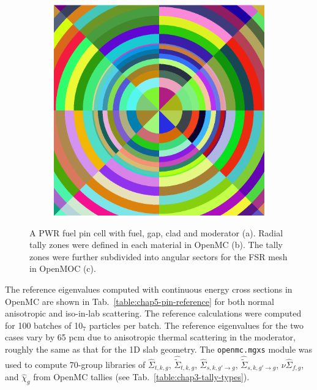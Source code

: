 \begin{figure}[H]
\begin{subfigure}{.32\textwidth}
  \caption{}
  \label{fig:chap5-pin-b}
\end{subfigure}
\begin{subfigure}{.32\textwidth}
  \centering
  \includegraphics[width=0.9\linewidth]{figures/biases/pin-cell/pin-cell-8x8}
  \caption{}
  \label{fig:chap5-pin-c}
\end{subfigure}
\caption[Pin cell materials and geometry]{A PWR fuel pin cell with fuel, gap, clad and moderator (a). Radial tally zones were defined in each material in OpenMC (b). The tally zones were further subdivided into angular sectors for the \ac{FSR} mesh in OpenMOC (c).}
\label{fig:chap5-pin-cell}
\end{figure}

The reference eigenvalues computed with continuous energy cross sections in OpenMC are shown in Tab.~\ref{table:chap5-pin-reference} for both normal anisotropic and iso-in-lab scattering. The reference calculations were computed for 100 batches of 10$_{7}$ particles per batch. The reference eigenvalues for the two cases vary by 65 \ac{pcm} due to anisotropic thermal scattering in the moderator, roughly the same as that for the 1D slab geometry. The \texttt{openmc.mgxs} module was used to compute 70-group libraries of $\hat{\Sigma}_{t,k,g}$, $\hat{\tilde{\Sigma}}_{t,k,g}$, $\hat{\Sigma}_{s,k,g'\rightarrow g}$, $\hat{\tilde{\Sigma}}_{s,k,g'\rightarrow g}$, $\nu\hat{\Sigma}_{f,g}$, and $\hat{\chi}_{g}$ from OpenMC tallies (see Tab.~\ref{table:chap3-tally-types}). 

